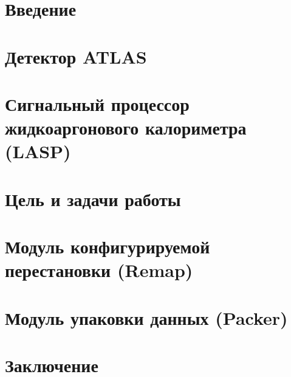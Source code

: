 \documentclass[a4paper, 14pt]{extarticle}
\begin{document}


\tableofcontents
\thispagestyle{empty}
\newpage

\setcounter{page}{3}
\section*{Введение}
    
    \newpage

\section{Детектор ATLAS}
    
    \newpage

\section{Сигнальный процессор жидкоаргонового калориметра (LASP)}
    
    \newpage

\section{Цель и задачи работы}
    
    \newpage

\section{Модуль конфигурируемой перестановки (Remap)}
    
    \newpage

\section{Модуль упаковки данных (Packer)}
    
    \newpage

\section*{Заключение}
    
    \newpage

%
\printbibliography

\end{document}
